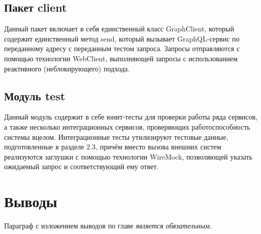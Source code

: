 \subsection{Пакет client}

Данный пакет включает в себя единственный класс GraphClient, который содержит единственный метод send, который вызывает GraphQL-сервис по переданному адресу с переданным тестом запроса.
Запросы отправляются с помощью технологии WebClient, выполняющей запросы с использованием реактивного (неблокирующего) подхода.

\subsection{Модуль test}

Данный модуль содержит в себе юнит-тесты для проверки работы ряда сервисов, а также несколько интеграционных сервисов, проверяющих работоспособность системы вцелом.
Интеграционные тесты утилизируют тестовые данные, подготовленные в разделе 2.3, причём вместо вызова внешних систем реализуются заглушки с помощью технологии WireMock, позволяющей указать ожидаемый запрос и соответствующий ему ответ.


\section{Выводы} \label{sec:ch3-conclusion}

Параграф с изложением выводов по главе \textit{является обязательным}.